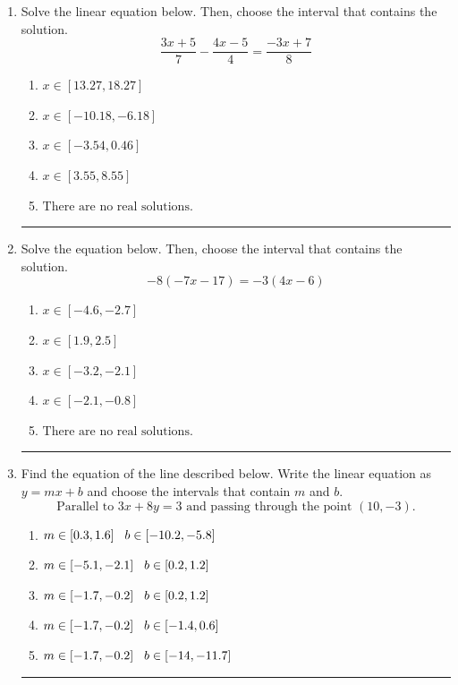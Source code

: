 \documentclass[14pt]{extbook}
\newcommand{\litem}[1]{\item#1\hspace*{-1cm}\rule{\textwidth}{0.4pt}}
\begin{document}
\begin{enumerate}
{\begin{enumerate}[label=\Alph*.]
\end{enumerate} }
\litem{
Solve the linear equation below. Then, choose the interval that contains the solution.\[ \frac{3x + 5}{7} - \frac{4x -5}{4} = \frac{-3x + 7}{8} \]\begin{enumerate}[label=\Alph*.]
\item \( x \in [13.27, 18.27] \)
\item \( x \in [-10.18, -6.18] \)
\item \( x \in [-3.54, 0.46] \)
\item \( x \in [3.55, 8.55] \)
\item \( \text{There are no real solutions.} \)

\end{enumerate} }
\litem{
Solve the equation below. Then, choose the interval that contains the solution.\[ -8(-7x -17) = -3(4x -6) \]\begin{enumerate}[label=\Alph*.]
\item \( x \in [-4.6, -2.7] \)
\item \( x \in [1.9, 2.5] \)
\item \( x \in [-3.2, -2.1] \)
\item \( x \in [-2.1, -0.8] \)
\item \( \text{There are no real solutions.} \)

\end{enumerate} }
\litem{
Find the equation of the line described below. Write the linear equation as $ y=mx+b $ and choose the intervals that contain $m$ and $b$.\[ \text{Parallel to } 3 x + 8 y = 3 \text{ and passing through the point } (10, -3). \]\begin{enumerate}[label=\Alph*.]
\item \( m \in [0.3, 1.6] \hspace*{3mm} b \in [-10.2, -5.8] \)
\item \( m \in [-5.1, -2.1] \hspace*{3mm} b \in [0.2, 1.2] \)
\item \( m \in [-1.7, -0.2] \hspace*{3mm} b \in [0.2, 1.2] \)
\item \( m \in [-1.7, -0.2] \hspace*{3mm} b \in [-1.4, 0.6] \)
\item \( m \in [-1.7, -0.2] \hspace*{3mm} b \in [-14, -11.7] \)


\end{enumerate}}
\end{enumerate}
\end{document}
